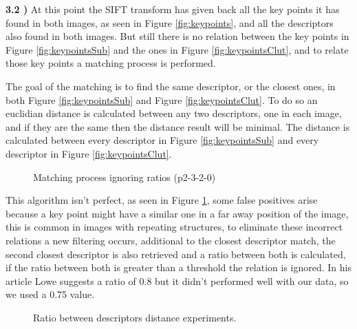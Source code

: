 \documentclass[12pt,a4paper]{article}
\begin{document}
\textbf{3.2 )} At this point the SIFT transform has given back all the key points it has found in both images, as seen in Figure \ref{fig:keypoints}, and all the descriptors also found in both images. But still there is no relation between the key points in Figure \ref{fig:keypointsSub} and the ones in Figure \ref{fig:keypointsClut}, and to relate those key points a matching process is performed.
\par
	The goal of the matching is to find the same descriptor, or the closest ones, in both Figure \ref{fig:keypointsSub} and Figure \ref{fig:keypointsClut}. To do so an euclidian distance is calculated between any two descriptors, one in each image, and if they are the same then the distance result will be minimal. The distance is calculated between every descriptor in Figure \ref{fig:keypointsSub} and every descriptor in Figure \ref{fig:keypointsClut}.

\begin{figure}[!h]
	\centering
		{
			\setlength{\fboxsep}{1pt}
			\setlength{\fboxrule}{1pt}
		}
	\caption{Matching process ignoring ratios (p2-3-2-0)}
	\label{fig:noRatio}
\end{figure}
	
	This algorithm isn't perfect, as seen in Figure \ref{fig:noRatio}, some false positives arise because a key point might have a similar one in a far away position of the image, this is common in images with repeating structures, to eliminate these incorrect relations a new filtering occurs, additional to the closest descriptor match, the second closest descriptor is also retrieved and a ratio between both is calculated, if the ratio between both is greater than a threshold the relation is ignored. In his article Lowe suggests a ratio of 0.8 but it didn't performed well with our data, so we used a 0.75 value.

\begin{figure}[!h]
	\centering
	\quad
	\caption{Ratio between descriptors distance experiments.}
	\label{fig:matchRatio}
\end{figure}
\end{document}
